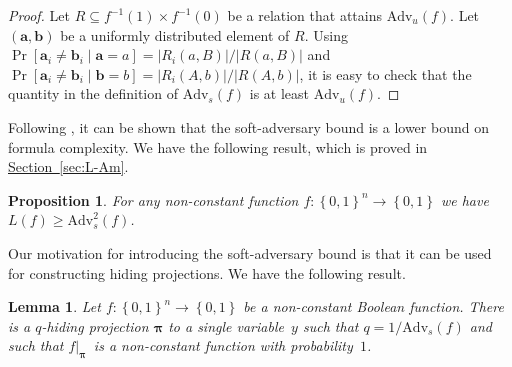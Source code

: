 \documentclass[11pt]{article}
\numberwithin{equation}{section}
\newtheorem{lemma}[theorem]{Lemma}
\newtheorem{proposition}[theorem]{Proposition}
\theoremstyle{definition}
\theoremstyle{plain}
\newcommand{\expref}[2]{\hyperref[#2]{#1~\ref{#2}}}
\theoremstyle{definition}\newtheorem{notation}[theorem]{Notation}\theoremstyle{plain}
\newcommand{\B}{\left\{ 0,1 \right \}}
\newcommand{\p}{\boldsymbol{\pi}}
\renewcommand{\a}{\boldsymbol{a}}
\renewcommand{\b}{\boldsymbol{b}}
\newcommand{\Amb}{\mathrm{Adv}_{u}}
\newcommand{\Am}{\mathrm{Adv}_{s}}
\theoremstyle{definition}
\theoremstyle{plain}
\begin{document}
\begin{proof}
Let $R\subseteq f^{-1}(1)\times f^{-1}(0)$ be a relation that attains
$\Amb(f)$. Let $(\a,\b)$ be a uniformly distributed element of $R$.
Using $\Pr[\a_{i}\neq\b_{i}\mid\a=a]=|R_{i}(a,B)|/|R(a,B)|$ and $\Pr[\a_{i}\neq\b_{i}\mid\b=b]=|R_{i}(A,b)|/|R(A,b)|$,
it is easy to check that the quantity in the definition of $\Am(f)$
is %
at least $\Amb(f)$.  %
\end{proof}
Following \cite{SS06,LLS06}, it can be shown that the soft-adversary
bound is a lower bound on formula complexity. We have the following
result, which is proved in \expref{Section}{sec:L-Am}. %
\begin{proposition}
\label{prop:L-Am} For any non-constant function $f\colon\B^{n}\to\B$
we have $L(f)\geq\Am^{2}(f)$. 
\end{proposition}

Our motivation for introducing the soft-adversary bound is that it
can be used for constructing hiding projections. We have the following
result.
\begin{lemma}
\label{lemma:ambainis-hiding}Let $f\colon\B^{n}\to\B$ be a non-constant
Boolean function. There is a $q$-hiding projection $\p$ to a single
variable~$y$ such that $q=1/\Am(f)$ and such that $f|_{\p}$~is
a non-constant function with probability~$1$. 
\end{lemma}
\end{document}
